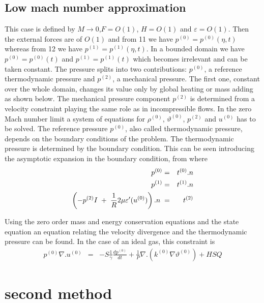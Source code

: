 \documentclass[11pt,a4paper]{article}
\begin{document}
\subsection{Low mach number approximation}
This case is defined by $M \rightarrow0 $,$F = O(1)$, $H = O(1)$ and $\varepsilon= O(1)$. Then
the external forces are of $O(1)$ and from 11 we have $p^{(0)} = p^{(0)}(\eta, t)$ whereas
from 12 we have $p^{(1)} = p^{(1)}(\eta, t)$. In a bounded domain we have $p^{(0)} = p^{(0)}(t)$
and $p^{(1)} = p^{(1)}(t)$ which becomes irrelevant and can be taken constant. The pressure
splits into two contributions: $p^{(0)}$, a reference thermodynamic pressure and
$p^{(2)}$, a mechanical pressure. The first one, constant over the whole domain,
changes its value only by global heating or mass adding as shown below. The
mechanical pressure component $p^{(2)}$ is determined from a velocity constraint
playing the same role as in incompressible flows. In the zero Mach number
limit a system of equations for $\rho^{(0)}$, $\vartheta^{(0)}$, $p^{(2)}$ and $u^{(0)}$ has to be solved.
The reference pressure $p^{(0)}$, also called thermodynamic pressure, depends
on the boundary conditions of the problem. The thermodynamic
pressure is determined by the boundary condition. This can be seen introducing
the asymptotic expansion in the boundary condition, from where
\begin{eqnarray}
p^{(0)}&=&t^{(0)}.n \\
p^{(1)}&=&t^{(1)}.n \\
\left(-p^{(2)}I\hspace{1mm}+\hspace{1mm}\frac{1}{R}2\mu\varepsilon'(u^{(0)})\right).n\hspace{1mm}&=&\hspace{1mm}t^{(2)}
\end{eqnarray}

Using the zero order mass and energy conservation equations
and the state equation an equation relating the velocity divergence and the
thermodynamic pressure can be found. In the case of an ideal gas, this constraint
is
\begin{eqnarray}
p^{(0)}\nabla. u^{(0)} &=& -S\frac{1}{\gamma}\frac{dp^{(0)}}{dt}+ \frac{1}{P}\nabla.(k^{(0)}\nabla\vartheta^{(0)}) + HSQ
\end{eqnarray}
\section{second method}
\end{document}
